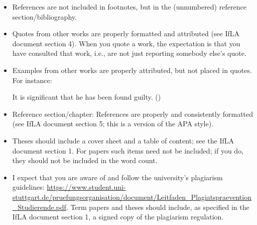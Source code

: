 \documentclass[11pt,fleqn,a4paper/thesis]{article}
\newcommand{\6}{\mbox{$[\hspace*{-.6mm}[$}}
\newcommand{\9}{\mbox{$]\hspace*{-.6mm}]$}}
\begin{document}
\begin{itemize}[itemsep=-1pt,leftmargin=2.5ex,topsep=-2pt]
\item References are not included in footnotes, but in the (unnumbered) reference section/bibliography.

\item Quotes from other works are properly formatted and attributed (see IfLA document section 4). When you quote a work, the expectation is that you have consulted that work, i.e., are not just reporting somebody else's quote.

\item Examples from other works are properly attributed, but not placed in quotes. For instance:

\begin{exe}
\ex It is significant that he has been found guilty. \hfill (\citealt[144]{kiparsky-kiparsky70})
\end{exe}

\item Reference section/chapter: References are properly and consistently formatted (see IfLA document section 5; this is a version of the APA style).

\item Theses should include a cover sheet and a table of content; see the IfLA document section 1. For papers such items need not be included; if you do, they should not be included in the word count.

\item I expect that you are aware of and follow the university's plagiarism guidelines: \url{https://www.student.uni-stuttgart.de/pruefungsorganisation/document/Leitfaden_Plagiatspraevention_Studierende.pdf}. Term papers and theses should include, as specified in the IfLA document section 1, a signed copy of the plagiarism regulation. 

\end{itemize}
	


\end{document}
